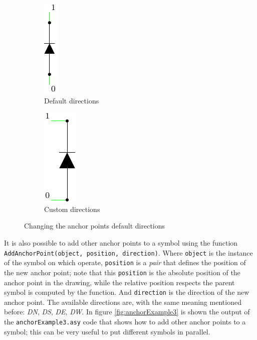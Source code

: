 \documentclass[a4paper,12pt]{report}
\begin{document}
\begin{figure}
  \centering
  \begin{subfigure}{.4\textwidth}
    \centering
    \includegraphics[width=0.1\linewidth]{anchorExample1.pdf}
    \caption{Default directions}
    \label{subFig:anchorExampleDefault}
  \end{subfigure}\hfill
  \begin{subfigure}{.4\textwidth}
    \centering
    \includegraphics[width=0.2\linewidth]{anchorExample2.pdf}
    \caption{Custom directions}
    \label{subFig:anchorExampleCustom}
  \end{subfigure}\hfill
  \caption{Changing the anchor points default directions}
  \label{fig:anchorPointExample}
\end{figure}

It is also possible to add other anchor points to a symbol using the function \texttt{AddAnchorPoint(object, position, direction)}. Where \texttt{object} is the instance of the symbol on which operate, \texttt{position} is a \emph{pair} that defines the position of the new anchor point; note that this \texttt{position} is the absolute position of the anchor point in the drawing, while the relative position respects the parent symbol is computed by the function. And \texttt{direction} is the direction of the new anchor point. The available directions are, with the same meaning mentioned before: \emph{DN}, \emph{DS}, \emph{DE}, \emph{DW}. In figure \ref{fig:anchorExample3} is shown the output of the \texttt{anchorExample3.asy} code that shows how to add other anchor points to a symbol; this can be very useful to put different symbols in parallel.
\end{document}
